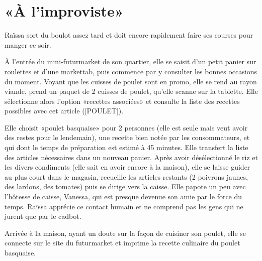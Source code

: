 \section{«À l'improviste»}

Raïssa sort du boulot assez tard et doit encore rapidement faire ses courses pour manger ce soir.
\par
À l'entrée du mini-futurmarket de son quartier, elle se saisit d'un petit panier sur roulettes et d'une markettab, puis commence par y consulter les bonnes occasions du moment.
Voyant que les cuisses de poulet sont en promo, elle se rend au rayon viande, prend un paquet de 2 cuisses de poulet, qu'elle scanne sur la tablette.
Elle sélectionne alors l'option «recettes associées» et consulte la liste des recettes possibles avec cet article ([POULET]).

Elle choisit «poulet basquaise» pour 2 personnes (elle est seule mais veut avoir des restes pour le lendemain), une recette bien notée par les consommateurs, et qui dont le temps de préparation est estimé à 45 minutes.
Elle transfert la liste des articles nécessaires dans un nouveau panier.
Après avoir désélectionné le riz et les divers condiments (elle sait en avoir encore à la maison), elle se laisse guider au plus court dans le magasin, recueille les articles restants (2 poivrons jaunes, des lardons, des tomates) puis se dirige vers la caisse.
Elle papote un peu avec l'hôtesse de caisse, Vanessa, qui est presque devenue son amie par le force du temps. 
Raïssa apprécie ce contact humain et ne comprend pas les gens qui ne jurent que par le cadbot.
\par
Arrivée à la maison, ayant un doute sur la façon de cuisiner son poulet, elle se connecte sur le site du futurmarket et imprime la recette culinaire du poulet basquaise.

